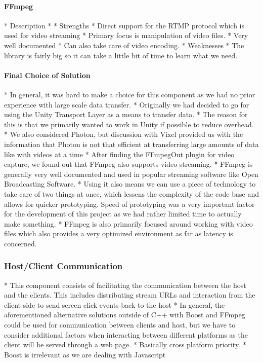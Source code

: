 \paragraph{FFmpeg}
    * Description
        * 
    * Strengths
        * Direct support for the RTMP protocol which is used for video streaming
        * Primary focus is manipulation of video files. 
        * Very well documented
        * Can also take care of video encoding. 
    * Weaknesses
        * The library is fairly big so it can take a little bit of time to learn what we need. 

\paragraph{Final Choice of Solution}
    * In general, it was hard to make a choice for this component as we had no prior experience with large scale data transfer.
    * Originally we had decided to go for using the Unity Transport Layer as a means to transfer data.
        * The reason for this is that we primarily wanted to work in Unity if possible to reduce overhead. 
    * We also considered Photon, but discussion with Vixel provided us with the information that Photon is not that efficient at transferring large amounts of data like with videos at a time
    * After finding the FFmpegOut plugin for video capture, we found out that FFmpeg also supports video streaming. 
        * FFmpeg is generally very well documented and used in popular streaming software like Open Broadcasting Software. 
        * Using it also means we can use a piece of technology to take care of two things at once, which lessens the complexity of the code base and allows for quicker prototyping. Speed of prototyping was a very important factor for the development of this project as we had rather limited time to actually make something. 
        * FFmpeg is also primarily focused around working with video files which also provides a very optimized environment as far as latency is concerned. 


\subsubsection{Host/Client Communication} %
    * This component consists of facilitating the communication between the host and the clients. This includes distributing stream URLs and interaction from the client side to send screen click events back to the host
    * In general, the aforementioned alternative solutions outside of C++ with Boost and FFmpeg could be used for communication between clients and host, but we have to consider additional factors when interacting between different platforms as the client will be served through a web page. 
        * Basically cross platform priority. 
        * Boost is irrelevant as we are dealing with Javascript
    
